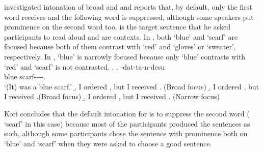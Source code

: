 %
 investigated intonation of broad and  and
reports that, by default,
only the first word receives  and the following word is
suppressed,
although some speakers put prominence on the second word too.
\Next[a] is the target sentence that he asked participants to read aloud
and \Next[b-c] are contexts.
In \Next[b-c], both  `blue' and  `scarf' are focused
because both of them contrast with `red' and `gloves' or `sweater', respectively.
In \Next[d],  `blue' is narrowly focused
because only  `blue' contrasts with `red' and
`scarf' is not contrasted.
%
\ex.
 \ag.  -dat-ta-n-desu \\
      blue scarf----. \\
      `(It) was a blue scarf.'
 \b. I ordered , but I received . \hfill{(Broad focus)}
 \b. I ordered , but I received .\hfill{(Broad focus)}
 \b. I ordered , but I received . \hfill{(Narrow focus)}

Kori concludes that
the default intonation for  is to suppress the second word ( `scarf' in this case)
because most of the participants produced the sentences as such,
although some participants chose the sentence with prominence both on  `blue' and  `scarf'
when they were asked to choose a good sentence.

